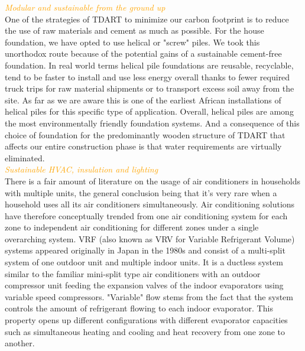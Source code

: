 \documentclass[justified]{tufte-book}
\begin{document}
	\textcolor{orange}{\textit{\Huge{Modular and sustainable from the ground up}}}
		\vspace*{2cm}\\
	One of the strategies of TDART to minimize our carbon footprint is to reduce the use of raw materials and cement as much as possible. For the house foundation, we have opted to use helical or "screw" piles. We took this unorthodox route because of the potential gains of a sustainable cement-free foundation. In real world terms helical pile foundations are reusable, recyclable, tend to be faster to install and use less energy overall thanks to fewer required truck trips for raw material shipments or to transport excess soil away from the site.  As far as we are aware this is one of the earliest African installations of helical piles for this specific type of application.  Overall, helical piles are among the most environmentally friendly foundation systems\cite{perko2009helical}. And a consequence of this choice of foundation for the predominantly wooden structure of TDART that affects our entire construction phase is that water requirements are virtually eliminated. 
		\vspace*{3cm}\\
	\textcolor{orange}{\textit{\Huge{Sustainable HVAC, insulation and lighting}}}
		\vspace*{2cm}\\
	There is a fair amount of literature\cite{jian2011study, ran2011wu, li2014testing}  on the usage of air conditioners in households  with multiple units, the general conclusion being that it's very rare when a household uses all its air conditioners simultaneously.
	Air conditioning solutions have therefore conceptually trended from one air conditioning system for each zone to independent air conditioning for different zones under a single overarching system\cite{park2001performance}. VRF (also known as VRV for Variable Refrigerant Volume) systems appeared originally in Japan in the 1980s and consist of a multi-split system of one outdoor unit and multiple indoor units. It is a ductless system similar to the familiar mini-split type air conditioners with an outdoor compressor unit feeding the expansion valves of the indoor evaporators using variable speed compressors. "Variable" flow stems from the fact that the system controls the amount of refrigerant flowing to each indoor evaporator. This property opens up different configurations with different evaporator capacities such as simultaneous heating and cooling and heat recovery from one zone to another\cite{goetzler2007variable}.
\end{document}
